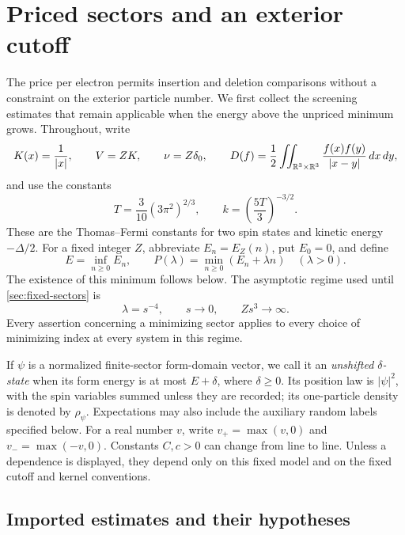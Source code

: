 \section{Priced sectors and an exterior cutoff}\label{sec:pricing}

The price per electron permits insertion and deletion comparisons without a
constraint on the exterior particle number.  We first collect the screening
estimates that remain applicable when the energy above the unpriced minimum
grows.  Throughout, write
\[
 K(x)=\frac1{|x|},\qquad V=ZK,\qquad \nu=Z\delta_0,\qquad
 D(f)=\frac12\iint_{\mathbb R^3\times\mathbb R^3}
                  \frac{f(x)f(y)}{|x-y|}\,dx\,dy,
\]
and use the constants
\[
 T=\frac3{10}(3\pi^2)^{2/3},\qquad
 k=\left(\frac{5T}{3}\right)^{-3/2}.
\]
These are the Thomas--Fermi constants for two spin states and kinetic energy
$-\Delta/2$.  For a fixed integer $Z$, abbreviate $E_n=E_Z(n)$, put $E_0=0$,
and define
\[
 E=\inf_{n\ge0}E_n,\qquad
 P(\lambda)=\min_{n\ge0}(E_n+\lambda n)\quad(\lambda>0).
\]
The existence of this minimum follows below.  The asymptotic regime used until
\cref{sec:fixed-sectors} is
\begin{equation}\label{eq:scaling-regime}
 \lambda=s^{-4},\qquad s\longrightarrow0,
 \qquad Zs^3\longrightarrow\infty.
\end{equation}
Every assertion concerning a minimizing sector applies to every choice of
minimizing index at every system in this regime.

If $\psi$ is a normalized finite-sector form-domain vector, we call it an
\emph{unshifted $\delta$-state} when its form energy is at most $E+\delta$,
where $\delta\ge0$.  Its position law is $|\psi|^2$, with the spin variables
summed unless they are recorded; its one-particle density is denoted by
$\rho_\psi$.  Expectations may also include the auxiliary random labels
specified below.  For a real number $v$, write $v_+=\max(v,0)$ and
$v_-=\max(-v,0)$.  Constants $C,c>0$ can change from line to line.  Unless a
dependence is displayed, they depend only on this fixed model and on the fixed
cutoff and kernel conventions.

\subsection{Imported estimates and their hypotheses}

